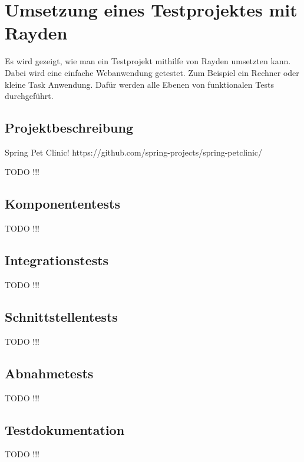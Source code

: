 ﻿\chapter{Umsetzung eines Testprojektes mit Rayden}
\label{cha:Testen}

Es wird gezeigt, wie man ein Testprojekt mithilfe von Rayden umsetzten kann. Dabei wird eine einfache Webanwendung getestet. Zum Beispiel ein Rechner oder kleine Task Anwendung. Dafür werden alle Ebenen von funktionalen Tests durchgeführt.


\section{Projektbeschreibung}

Spring Pet Clinic!
https://github.com/spring-projects/spring-petclinic/

TODO !!!

\section{Komponententests}

TODO !!!

\section{Integrationstests}

TODO !!!

\section{Schnittstellentests}

TODO !!!

\section{Abnahmetests}

TODO !!!

\section{Testdokumentation}

TODO !!!
